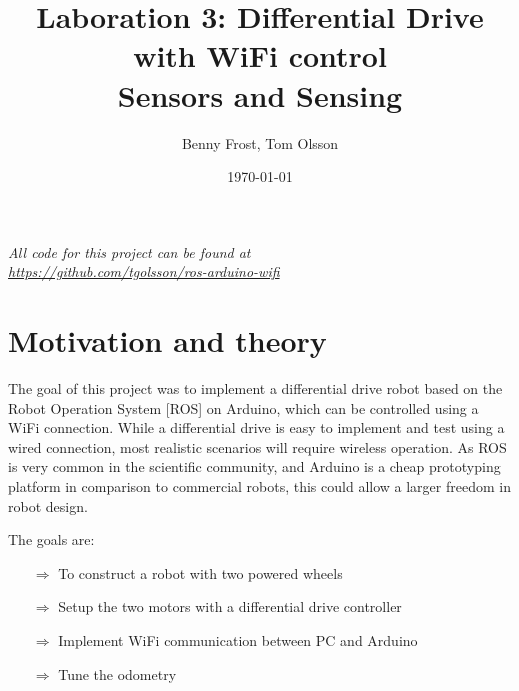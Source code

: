 \documentclass[11pt]{article}
\title{Laboration 3: Differential Drive with WiFi control\\ {\small Sensors and
    Sensing}} \author{Benny Frost, Tom Olsson} \date{\today}
\begin{document}
\maketitle %
\begin{center}
  \emph{All code for this project can be found at \\
    \url{https://github.com/tgolsson/ros-arduino-wifi}}
\end{center}
\tableofcontents
\lstlistoflistings %
\listoffigures %
\listoftables \lstset{
  matchrangestart=t} %


\section{Motivation and theory}
The goal of this project was to implement a differential drive robot based on
the Robot Operation System [ROS] on Arduino, which can be controlled using a
WiFi connection. While a differential drive is easy to implement and test using
a wired connection, most realistic scenarios will require wireless operation. As
ROS is very common in the scientific community, and Arduino is a cheap
prototyping platform in comparison to commercial robots, this could allow a
larger freedom in robot design. \par

The goals are:
\begin{itemize}
\item[$\Rightarrow$] To construct a robot with two powered wheels
\item[$\Rightarrow$] Setup the two motors with a differential drive controller
\item[$\Rightarrow$] Implement WiFi communication between PC and Arduino
\item[$\Rightarrow$] Tune the odometry
\end{itemize}
\end{document}
